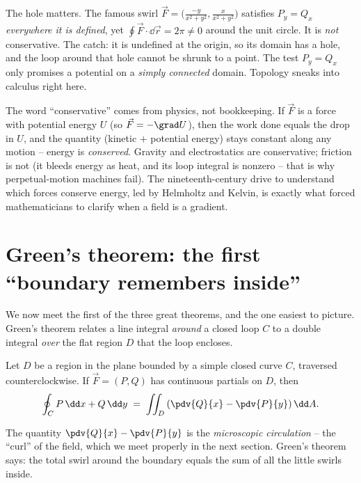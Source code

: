 \begin{trapbox}
The hole matters. The famous swirl
$\vec F = \big(\frac{-y}{x^2+y^2}, \frac{x}{x^2+y^2}\big)$ satisfies $P_y=Q_x$
\emph{everywhere it is defined}, yet $\oint \vec F\cdot\dd\vec r = 2\pi \ne 0$
around the unit circle. It is \emph{not} conservative. The catch: it is undefined
at the origin, so its domain has a hole, and the loop around that hole cannot be
shrunk to a point. The test $P_y=Q_x$ only promises a potential on a
\emph{simply connected} domain. Topology sneaks into calculus right here.
\end{trapbox}

\begin{historybox}
The word ``conservative'' comes from physics, not bookkeeping. If $\vec F$ is a
force with potential energy $U$ (so $\vec F=-\grad U$), then the work done equals
the drop in $U$, and the quantity (kinetic $+$ potential energy) stays constant
along any motion -- energy is \emph{conserved}. Gravity and electrostatics are
conservative; friction is not (it bleeds energy as heat, and its loop integral is
nonzero -- that is why perpetual-motion machines fail). The nineteenth-century
drive to understand which forces conserve energy, led by Helmholtz and Kelvin, is
exactly what forced mathematicians to clarify when a field is a gradient.
\end{historybox}

\section{Green's theorem: the first ``boundary remembers inside''}
\label{ch35:green}

We now meet the first of the three great theorems, and the one easiest to picture.
Green's theorem relates a line integral \emph{around} a closed loop $C$ to a double
integral \emph{over} the flat region $D$ that the loop encloses.

\begin{theorem}
\label{ch35:thm-green}
Let $D$ be a region in the plane bounded by a simple closed curve $C$, traversed
counterclockwise. If $\vec F=(P,Q)$ has continuous partials on $D$, then
\[
  \oint_C P\,\dd x + Q\,\dd y \;=\; \iint_D \left(\pdv{Q}{x} - \pdv{P}{y}\right)\dd A.
\]
\end{theorem}

The quantity $\pdv{Q}{x}-\pdv{P}{y}$ is the \emph{microscopic circulation} -- the
``curl'' of the field, which we meet properly in the next section. Green's theorem
says: the total swirl around the boundary equals the sum of all the little swirls
inside.

